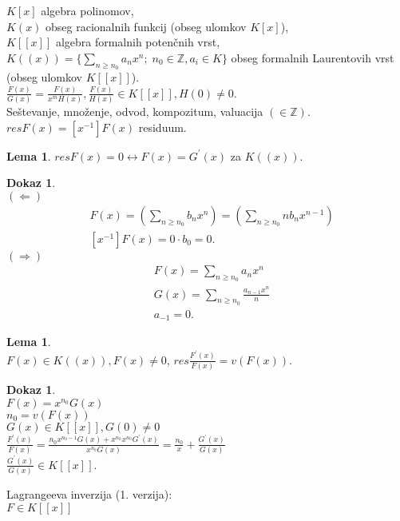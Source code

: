 \documentclass[a4paper, 12pt]{book}
\theoremstyle{definition}
\newtheorem{lemma}[counter]{Lema}
\newtheorem{pro}[counter]{Dokaz}
\theoremstyle{remark}
\newcommand{\Z}{\mathbb{Z}}
\begin{document}
$K[x]$ algebra polinomov, \\
$K(x)$ obseg racionalnih funkcij (obseg ulomkov $K[x]$), \\
$K[[x]]$ algebra formalnih potenčnih vrst, \\
$K((x)) = \{\sum_{n \geq n_0} a_n x^n; \; n_0 \in \Z, a_i \in K\}$ obseg formalnih Laurentovih vrst (obseg ulomkov $K[[x]]$). \\
$\frac{F(x)}{G(x)} = \frac{F(x)}{x^m H(x)}, \frac{F(x)}{H(x)} \in K[[x]], H(0) \neq 0$. \\
Seštevanje, množenje, odvod, kompozitum, valuacija $(\in \Z)$. \\
$res F(x) = [x^{-1}] F(x)$ residuum.
\begin{lemma}
  $res F(x) = 0 \leftrightarrow F(x) = G^{'}(x)$ za $K((x))$.
\end{lemma}
\begin{pro} \text{} \\
  $(\Longleftarrow)$
  \begin{align*}
    &F(x) = \left(\sum_{n \geq n_0} b_n x^n \right) = \left(\sum_{n \geq n_0} n b_n x^{n-1} \right) \\
    &[x^{-1}] F(x) = 0 \cdot b_0 = 0.
  \end{align*}
  $(\Longrightarrow)$
  \begin{align*}
    &F(x) = \sum_{n \geq n_0} a_n x^n \\
    &G(x) = \sum_{n \geq n_0} \frac{a_{n-1} x^n}{n} \\
    &a_{-1} = 0.
  \end{align*}
\end{pro}
\begin{lemma} \text{} \\
  $F(x) \in K((x)), F(x) \neq 0$,
  $res \frac{F^{'}(x)}{F(x)} = v(F(x))$.
\end{lemma}
\begin{pro} \text{} \\
  $F(x) = x^{n_0} G(x)$ \\
  $n_0 = v(F(x))$ \\
  $G(x) \in K[[x]], G(0) \neq 0$ \\
  $\frac{F^{'}(x)}{F(x)} = \frac{n_0 x^{n_0 - 1} G(x) + x^{n_0} x^{n_0} G^{'}(x)}{x^{n_0} G(x)} = \frac{n_0}{x} + \frac{G^{'}(x)}{G(x)}$ \\
  $\frac{G^{'}(x)}{G(x)} \in K[[x]]$.
\end{pro}
Lagrangeeva inverzija (1. verzija): \\
$F \in K[[x]]$ \\
\end{document}
